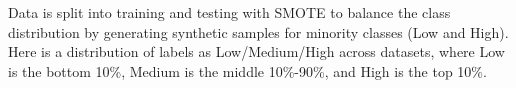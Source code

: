 \documentclass[preview]{standalone}
\begin{document}
Data is split into training and testing with SMOTE to balance the class distribution by generating synthetic samples for minority classes (Low and High).\\Here is a distribution of labels as Low/Medium/High across datasets, where Low is the bottom 10\%, Medium is the middle 10\%-90\%, and High is the top 10\%.\\
\end{document}
